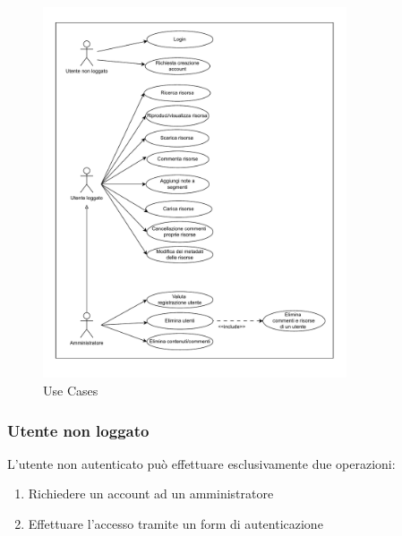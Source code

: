 \documentclass[a4paper]{article}
\begin{document}
\begin{figure}[H]
    \centering
    \includegraphics[width=0.8\textwidth]{./figures/use_cases}
    \caption{Use Cases}
    \label{fig:use_cases}
\end{figure}
\newpage
\subsubsection{Utente non loggato}
L'utente non autenticato può effettuare esclusivamente due operazioni:
    \begin{enumerate}
        \item Richiedere un account ad un amministratore
        \item Effettuare l'accesso tramite un form di autenticazione
    \end{enumerate}
\end{document}
